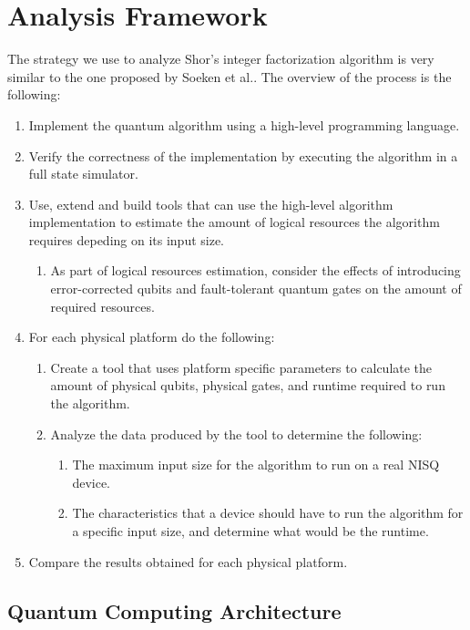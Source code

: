 %
%
\chapter {Analysis Framework}

The strategy we use to analyze Shor's integer factorization algorithm is very similar to the one proposed by Soeken et al.\cite{ResourceEstimationFramework_Soeken_2021}. The overview of the process is the following:
\begin{enumerate}
    \item Implement the quantum algorithm using a high-level programming language.
    \item Verify the correctness of the implementation by executing the algorithm in a full state simulator.
    \item Use, extend and build tools that can use the high-level algorithm implementation to estimate the amount of logical resources the algorithm requires depeding on its input size.
    \begin{enumerate}
        \item As part of logical resources estimation, consider the effects of introducing error-corrected qubits and fault-tolerant quantum gates on the amount of required resources.
    \end{enumerate}
    \item For each physical platform do the following:
    \begin{enumerate}
        \item Create a tool that uses platform specific parameters to calculate the amount of physical qubits, physical gates, and runtime required to run the algorithm.
        \item Analyze the data produced by the tool to determine the following:
        \begin{enumerate}
            \item The maximum input size for the algorithm to run on a real NISQ device.
            \item The characteristics that a device should have to run the algorithm for a specific input size, and determine what would be the runtime.
        \end{enumerate}
    \end{enumerate}
    \item Compare the results obtained for each physical platform.
\end{enumerate}

\section{Quantum Computing Architecture}

